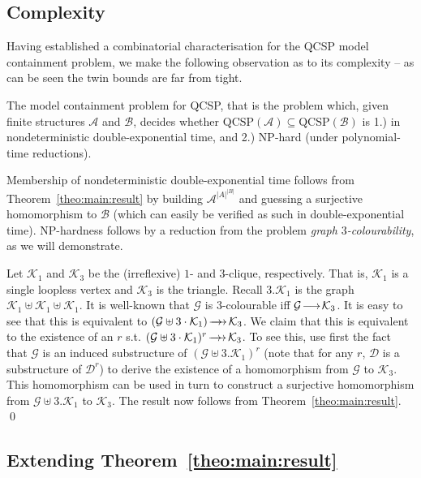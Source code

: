 \documentclass{LMCS}
\newcommand{\surhom}{
  \ensuremath{
      \negthinspace 
      \longrightarrow
      \hspace{-5mm} \rightarrow \hspace{1mm}
  }
}
\newcommand{\homm}{
  \ensuremath{
      \negthinspace 
      \longrightarrow
      \negthinspace
  }
}
\begin{document}
\subsection{Complexity}
\label{RHS:Complexity}

Having established a combinatorial characterisation for the QCSP model containment problem, we make the following observation as to its complexity -- as can be seen the twin bounds are far from tight.
\begin{thm}
The model containment problem for QCSP, that is the problem which, given finite structures $\mathcal{A}$ and $\mathcal{B}$, decides whether $\mathrm{QCSP}(\mathcal{A}) \subseteq \mathrm{QCSP}(\mathcal{B})$ is 1.) in nondeterministic double-exponential time, and 2.) NP-hard (under polynomial-time reductions).
\end{thm}
\proof
Membership of nondeterministic double-exponential time follows from Theorem~\ref{theo:main:result} by building $\mathcal{A}^{|A|^{|B|}}$ and guessing a surjective homomorphism to $\mathcal{B}$ (which can easily be verified as such in double-exponential time). NP-hardness follows by a reduction from the problem \emph{graph $3$-colourability}, as we will demonstrate.

Let $\mathcal{K}_1$ and $\mathcal{K}_3$ be the (irreflexive) $1$- and $3$-clique, respectively. That is, $\mathcal{K}_1$ is a single loopless vertex and $\mathcal{K}_3$ is the triangle. 
Recall $3.\mathcal{K}_1$ is the graph $\mathcal{K}_1 \uplus \mathcal{K}_1 \uplus \mathcal{K}_1$. It is well-known that $\mathcal{G}$ is $3$-colourable iff $\mathcal{G} \homm \mathcal{K}_3$. It is easy to see that this is equivalent to $(\mathcal{G} \uplus 3\cdot \mathcal{K}_1) \surhom \mathcal{K}_3$. We claim that this is equivalent to the existence of an $r$ s.t. $(\mathcal{G} \uplus 3\cdot \mathcal{K}_1)^r \surhom \mathcal{K}_3$. 
To see this, use first the fact that $\mathcal{G}$ is an induced substructure of $(\mathcal{G} \uplus 3.\mathcal{K}_1)^r$ (note that for any $r$, $\mathcal{D}$ is a substructure of $\mathcal{D}^r$) to derive the existence of a homomorphism from $\mathcal{G}$ to $\mathcal{K}_3$. This homomorphism can be used in turn to construct a surjective homomorphism from $\mathcal{G} \uplus 3.\mathcal{K}_1$ to $\mathcal{K}_3$.
The result now follows from Theorem~\ref{theo:main:result}. 
\qed

\subsection{Extending Theorem~\ref{theo:main:result}}
\label{sec:omega-cat}
\end{document}
